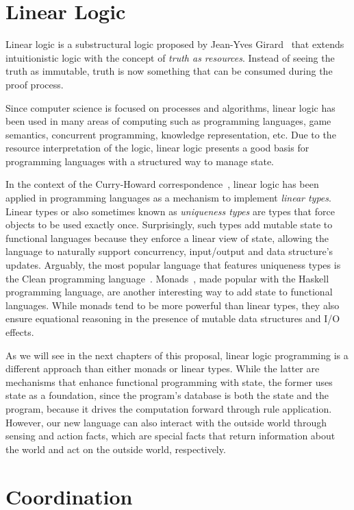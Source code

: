 \section{Linear Logic}

Linear logic is a substructural logic proposed by Jean-Yves
Girard~\cite{Girard95logic:its} that extends intuitionistic logic with the
concept of \emph{truth as resources}. Instead of seeing the truth as immutable,
truth is now something that can be consumed during the proof process.

Since computer science is focused on processes and algorithms, linear logic has
been used in many areas of computing such as programming languages, game
semantics, concurrent programming, knowledge representation, etc.  Due to the
resource interpretation of the logic, linear logic presents a good basis for
programming languages with a structured way to manage state.

In the context of the Curry-Howard correspondence~\cite{howard:tfatnoc}, linear
logic has been applied in programming languages as a mechanism to implement
\emph{linear types}. Linear types or also sometimes known as \emph{uniqueness
types} are types that force objects to be used exactly once. Surprisingly,
such types add mutable state to functional languages because they enforce a
linear view of state, allowing the language to naturally support concurrency,
input/output and data structure's updates.  Arguably, the most popular
language that features uniqueness types is the Clean programming
language~\cite{JFP:1349748}.  Monads~\cite{Wadler:1997:DI:262009.262011},
made popular with the Haskell programming language, are another interesting
way to add state to functional languages. While monads tend to be more
powerful than linear types, they also ensure equational reasoning in the
presence of mutable data structures and I/O effects.

As we will see in the next chapters of this proposal, linear logic programming
is a different approach than either monads or linear types.  While the latter
are mechanisms that enhance functional programming with state, the former uses
state as a foundation, since the program's database is both the state and the
program, because it drives the computation forward through rule application.
However, our new language can also interact with the outside world through
sensing and action facts, which are special facts that return information about
the world and act on the outside world, respectively.

\section{Coordination}

